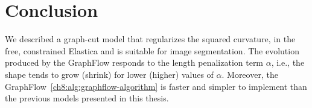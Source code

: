 \section{Conclusion}
We described a graph-cut model that regularizes the squared curvature, in the free, constrained Elastica and is suitable for image segmentation. The evolution produced by the GraphFlow responds to the length penalization term $\alpha$, i.e., the shape tends to grow (shrink) for lower (higher) values of $\alpha$.  Moreover, the GraphFlow~\cref{ch8:alg:graphflow-algorithm} is faster and simpler to implement than the previous models presented in this thesis.

